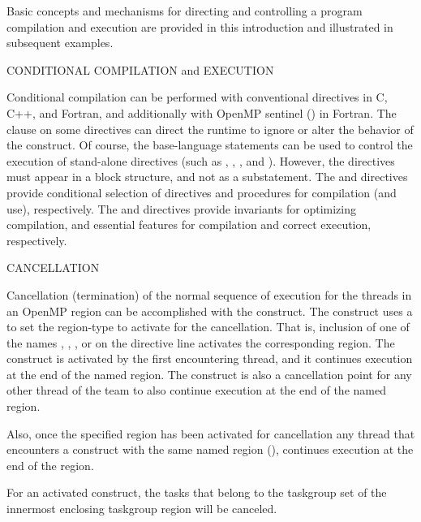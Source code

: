\label{chap:program_control}

Basic concepts and mechanisms for directing and controlling a program compilation and execution
are provided in this introduction and illustrated in subsequent examples.

\bigskip
CONDITIONAL COMPILATION and EXECUTION

Conditional compilation can be performed with conventional  directives
in C, C++, and Fortran, and additionally with OpenMP sentinel (\scode{!$}) in Fortran. 
The  clause on some directives
can direct the runtime to ignore or alter the behavior of the construct.
Of course, the base-language  statements can be used to control the execution
of stand-alone directives (such as , , , 
and ).
However, the directives must appear in a block structure, and not as a substatement.
The  and  directives provide conditional 
selection of directives and procedures for compilation (and use), respectively.
The  and  directives provide invariants
for optimizing compilation, and essential features for compilation 
and correct execution, respectively.


\bigskip
CANCELLATION

Cancellation (termination) of the normal sequence of execution for the threads in an OpenMP region can
be accomplished with the  construct. The construct uses a
 to set the region-type to activate for the cancellation. 
That is, inclusion of one of the  names , , 
,  or  on the directive line 
activates the corresponding region.
The  construct is activated by the first encountering thread, and it
continues execution at the end of the named region.
The  construct is also a cancellation point for any other thread of the team 
to also continue execution at the end of the named region.  

Also, once the specified region has been activated for cancellation any thread that encounters
a  construct with the same named region (),
continues execution at the end of the region.

For an activated  construct, the tasks that
belong to the taskgroup set of the innermost enclosing taskgroup region will be canceled. 

